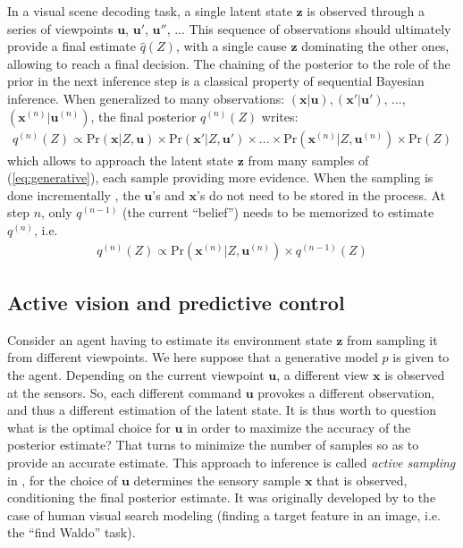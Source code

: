\documentclass[12pt,twoside,openright]{article}
\begin{document}
In a visual scene decoding task, a single latent state $\boldsymbol{z}$ is
observed through a series of viewpoints $\boldsymbol{u}$, $\boldsymbol{u}'$, $\boldsymbol{u}''$, ... This sequence of observations should ultimately provide a final estimate $\hat{q}(Z)$, with a single cause $\hat{\boldsymbol{z}}$ dominating the other ones, allowing to reach a final decision. 
The chaining of the posterior to the role of the prior in the next inference step is a classical property of sequential Bayesian inference.
When generalized to many observations: $(\boldsymbol{x}|\boldsymbol{u}), (\boldsymbol{x}'|\boldsymbol{u}')$, ..., $(\boldsymbol{x}^{(n)}|\boldsymbol{u}^{(n)})$, the final posterior $q^{(n)}(Z)$ writes:
\begin{align}
q^{(n)}(Z) \propto \text{Pr}(\boldsymbol{x}|Z,\boldsymbol{u}) \times \text{Pr}(\boldsymbol{x}'|Z,\boldsymbol{u}') \times ... \times \text{Pr}(\boldsymbol{x}^{(n)}|Z,\boldsymbol{u}^{(n)}) \times \text{Pr}(Z) \label{eq:accum}
\end{align}
which allows to approach the latent state $\boldsymbol{z}$ from many samples of (\ref{eq:generative}), each sample providing more evidence. 
When the sampling is done incrementally \citep{wald1945sequential},
the $\boldsymbol{u}$'s and $\boldsymbol{x}$'s do not need to be stored in the process. At step $n$, only $q^{(n-1)}$ (the current ``belief'') needs to be memorized to estimate $q^{(n)}$, i.e. 
\begin{align} 
q^{(n)}(Z) \propto \text{Pr}(\boldsymbol{x}^{(n)}|Z,\boldsymbol{u}^{(n)}) \times q^{(n-1)}(Z) \label{eq:accum-post}
\end{align}

\subsection{Active vision and predictive control}\label{sec:perception-driven-control}


Consider an agent having to estimate its environment state $\boldsymbol{z}$ from sampling it from different viewpoints. We here suppose that a generative model $p$ is given to the agent. 
Depending on  the current viewpoint $\boldsymbol{u}$, a different view $\boldsymbol{x}$ is observed at the sensors. So, each different command $\boldsymbol{u}$ provokes a different observation, and thus a different 
estimation of the latent state. It is thus worth to question what is the optimal choice for $\boldsymbol{u}$ in order to maximize the accuracy of the posterior estimate?
That turns  to minimize the number of samples so as to provide an accurate estimate. This approach to inference is called \emph{active sampling} in \citet{friston2012perceptions}, for the choice of $\boldsymbol{u}$ determines the sensory sample $\boldsymbol{x}$ that is observed, conditioning the final posterior estimate. It was originally developed by \citet{najemnik2005optimal} to the case of human visual search modeling (finding a target feature in an image, i.e. the ``find Waldo'' task).
\end{document}
